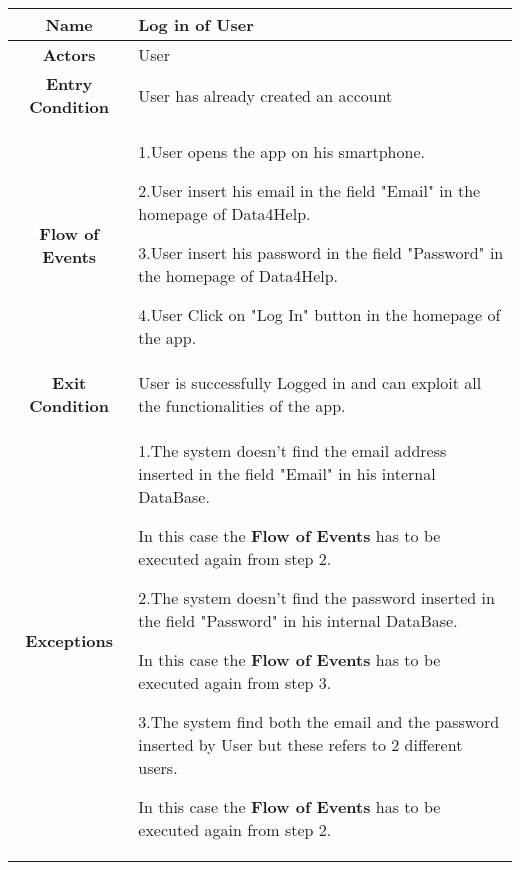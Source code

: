       \begin{table}[h!]
        \centering
        \begin{tabularx}{\linewidth}{|c|X|}
          \hline
          \textbf{Name} & Log in of User \\
        	\hline
        	\textbf{Actors} & User \\
        	\hline
        	\textbf{Entry Condition} & User has already created an account\\
        	\hline
        	\textbf{Flow of Events} & 1.User opens the app on his smartphone.

        					2.User insert his email in the field "Email" in the homepage of Data4Help.

        					3.User insert his password in the field "Password" in the homepage of Data4Help.

        					4.User Click on "Log In" button in the homepage of the app.\\
        	\hline
        	\textbf{Exit Condition} & User is successfully Logged in and can exploit all the functionalities of the app. \\
        	\hline
        	\textbf{Exceptions} & 1.The system doesn't find the email address inserted in the field "Email" in his internal DataBase.

        				In this case the \textbf{Flow of Events} has to be executed again from step 2.

        				2.The system doesn't find the password inserted in the field "Password" in his internal DataBase.

        				 In this case the \textbf{Flow of Events} has to be executed again from step 3.

        				3.The system find both the email and the password inserted by User but these refers to 2 different users.

        				In this case the \textbf{Flow of Events} has to be executed again from step 2. \\
          \hline
        \end{tabularx}
      \end{table}



